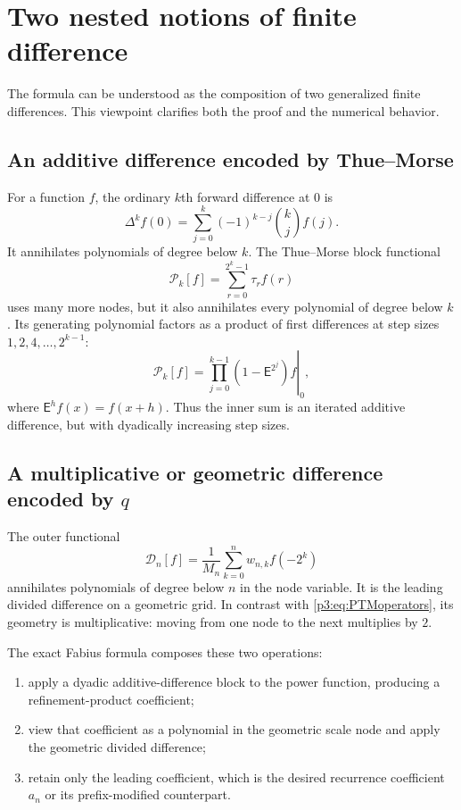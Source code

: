 \documentclass[11pt,oneside]{article}
\theoremstyle{definition}
\theoremstyle{remark}
\newcommand{\tm}{\tau}
\begin{document}
\section{Two nested notions of finite difference}

The formula can be understood as the composition of two generalized finite
differences.  This viewpoint clarifies both the proof and the numerical
behavior.

\subsection{An additive difference encoded by Thue--Morse}

For a function $f$, the ordinary $k$th forward difference at $0$ is
\[
 \Delta^kf(0)=\sum_{j=0}^{k}(-1)^{k-j}\binom{k}{j}f(j).
\]
It annihilates polynomials of degree below $k$.  The Thue--Morse block
functional
\begin{equation}\label{p3:eq:PTMfunctional}
 \mathcal P_k[f]=\sum_{r=0}^{2^k-1}\tm_rf(r)
\end{equation}
uses many more nodes, but it also annihilates every polynomial of degree
below $k$.  Its generating polynomial factors as a product of first
differences at step sizes $1,2,4,\ldots,2^{k-1}$:
\begin{equation}\label{p3:eq:PTMoperators}
 \mathcal P_k[f]
 =\left.\prod_{j=0}^{k-1}(1-\mathsf E^{2^j})f\right|_{0},
\end{equation}
where $\mathsf E^hf(x)=f(x+h)$.  Thus the inner sum is an iterated additive
difference, but with dyadically increasing step sizes.

\subsection{A multiplicative or geometric difference encoded by \texorpdfstring{$q$}{q}}

The outer functional
\[
 \mathcal D_n[f]=\frac1{M_n}\sum_{k=0}^{n}w_{n,k}f(-2^k)
\]
annihilates polynomials of degree below $n$ in the node variable.  It is the
leading divided difference on a geometric grid.  In contrast with
\eqref{p3:eq:PTMoperators}, its geometry is multiplicative: moving from one
node to the next multiplies by $2$.

The exact Fabius formula composes these two operations:
\begin{enumerate}[leftmargin=2.2em]
\item apply a dyadic additive-difference block to the power function,
producing a refinement-product coefficient;
\item view that coefficient as a polynomial in the geometric scale node and
apply the geometric divided difference;
\item retain only the leading coefficient, which is the desired recurrence
coefficient $a_n$ or its prefix-modified counterpart.
\end{enumerate}
\end{document}
